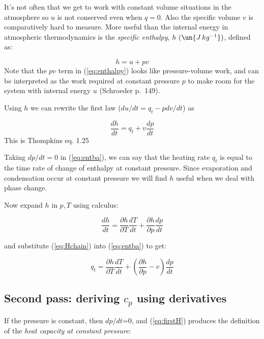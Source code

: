 \documentclass[12pt]{article}
\begin{document}
It's not often that we get to work with constant volume situations in
the atmosphere so $u$ is not conserved even when $q=0$.  Also the
specific volume $v$ is comparatively hard to measure.
More useful than the internal energy in atmospheric thermodynamics is
the \textit{specific enthalpy}, $h\ (\un{J\,kg^{-1}})$, defined as:

\begin{equation}
  \label{eq:enthalpy}
  h  = u + pv
\end{equation}
Note that the $p v$ term in (\ref{eq:enthalpy}) looks like pressure-volume
work, and can be interpreted as the work required at constant pressure $p$
to make room for the system with internal energy $u$ (Schroeder p.~149).

Using $h$ we can rewrite the first law ($du/dt = q_t - p dv/dt$) as

\begin{equation}
  \label{eq:entba}
  \frac{dh}{dt} = q_t   + v \frac{dp}{dt}
\end{equation}
This  is Thompkins eq. 1.25


Taking $dp/dt=0$ in (\ref{eq:entba}), we can say that the heating rate
$q_t$ is equal to the time rate of change of enthalpy at constant
pressure.  Since evaporation and condensation occur at constant
pressure we will find $h$ useful when we deal with phase change.

Now expand $h$ in $p,T$ using calculus:

\begin{equation}
  \label{eq:Hchain}
  \frac{dh}{dt} = \frac{\partial h}{\partial T} \frac{dT}{dt} + 
                  \frac{\partial h}{\partial p} \frac{dp}{dt}
\end{equation}

and substitute (\ref{eq:Hchain}) into (\ref{eq:entba}) to get:

\begin{equation}
  \label{eq:firstH}
  q_t = \frac{\partial h}{\partial T} \frac{dT}{dt} + \left ( \frac{\partial h}{\partial p} - v 
                        \right ) \frac{dp}{dt}
\end{equation}


\subsection{Second pass:  deriving $c_p$ using derivatives}
\label{sec:second-pass:-c_p}



If the pressure is constant, then $dp/dt$=0, and (\ref{eq:firstH})
produces the definition of the \textit{heat capacity at constant
  pressure}:
\end{document}
